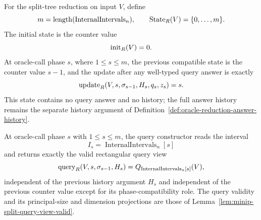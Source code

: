 \begin{definition}
  \label{def:minip-bi-to-mono-local-phase-counter-schedule}
  For the split-tree reduction on input $V$, define
  \[
    m=\operatorname{length}(\operatorname{InternalIntervals}_n),
    \qquad
    \operatorname{State}_R(V)=\{0,\ldots,m\}.
  \]
  The initial state is the counter value
  \[
    \operatorname{init}_R(V)=0.
  \]
  At oracle-call phase $s$, where $1\leq s\leq m$, the previous compatible
  state is the counter value $s-1$, and the update after any well-typed query
  answer is exactly
  \[
    \operatorname{update}_R(V,s,\sigma_{s-1},H_s,q_s,z_s)=s.
  \]
  This state contains no query answer and no history; the full answer history
  remains the separate history argument of
  Definition~\ref{def:oracle-reduction-answer-history}.
\end{definition}

\begin{definition}
  \label{def:minip-bi-to-mono-local-phase-query-schedule}
  At oracle-call phase $s$ with $1\leq s\leq m$, the query constructor reads
  the interval
  \[
    I_s=\operatorname{InternalIntervals}_n[s]
  \]
  and returns exactly the valid rectangular query view
  \[
    \operatorname{query}_R(V,s,\sigma_{s-1},H_s)=Q_{\operatorname{InternalIntervals}_n[s]}(V),
  \]
  independent of the previous history argument $H_s$ and independent of the
  previous counter value except for its phase-compatibility role.  The query
  validity and its principal-size and dimension projections are those of
  Lemma~\ref{lem:minip-split-query-view-valid}.
\end{definition}

